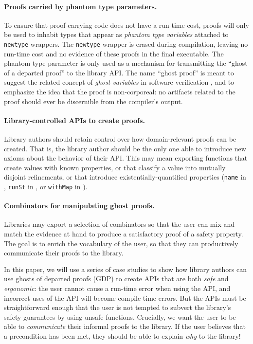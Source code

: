 \documentclass[format=sigplan, review=false, screen=true, 10pt]{acmart}
\makeatletter
\let\origsubsection\subsection
\renewcommand\subsection{\@ifstar{\starsubsection}{\nostarsubsection}}
\newcommand\nostarsubsection[1]
{\subsectionprelude\origsubsection{#1}\subsectionpostlude}
\newcommand\starsubsection[1]
{\subsectionprelude\origsubsection*{#1}\subsectionpostlude}
\newcommand\subsectionprelude{%
  \vspace{-0.25em}
}
\newcommand\subsectionpostlude{%
  \vspace{-0.05em}
}
\makeatother
\begin{document}
\paragraph{Proofs carried by phantom type parameters.}
  To ensure that proof-carrying code does not have a run-time cost, proofs will only
  be used to inhabit types that appear as \emph{phantom type variables} attached to
  \texttt{newtype} wrappers.
  The \texttt{newtype} wrapper is erased during compilation, leaving no run-time cost and
  no evidence of these proofs in the final executable.
  The phantom type parameter is only used as a mechanism for transmitting the
  ``ghost of a departed proof'' to the library API.
  The name ``ghost proof'' is meant to suggest the related concept of \emph{ghost variables} in software
  verification \cite{leavens1999jml}, and to emphasize the idea that the proof is non-corporeal: no
  artifacts related to the proof should ever be discernible from the compiler's output.
\paragraph{Library-controlled APIs to create proofs.}
  Library authors should retain control over how domain-relevant proofs can be created.
  That is, the library author should be the only one able to introduce new axioms about
  the behavior of their API.
  This may mean exporting functions that create values with known properties, or that
  classify a value into mutually disjoint refinements,
or that introduce existentially-quantified properties (\texttt{name} in , \texttt{runSt} in , or \texttt{withMap}
in ).
\paragraph{Combinators for manipulating ghost proofs.}
  Libraries may export a selection of combinators so that the user can
  mix and match the evidence at hand to produce a satisfactory proof of a
  safety property. The goal is to enrich the vocabulary of the user, so
  that they can productively communicate their proofs to the library.


\subsection{The structure of this paper}
In this paper, we will use a series of case studies to show how library authors can use
ghosts of departed proofs (GDP) to create
APIs that are both \emph{safe} and \emph{ergonomic}: the
user cannot cause a run-time error when using the API, and incorrect uses
of the API will become compile-time errors. But the APIs must be straightforward
enough that the user is not tempted to subvert the library's safety guarantees by using
unsafe functions. Crucially, we want the user to be able to \emph{communicate} their
informal proofs to the library. If the user believes that a precondition has been met,
they should be able to explain \emph{why} to the library!
\end{document}
